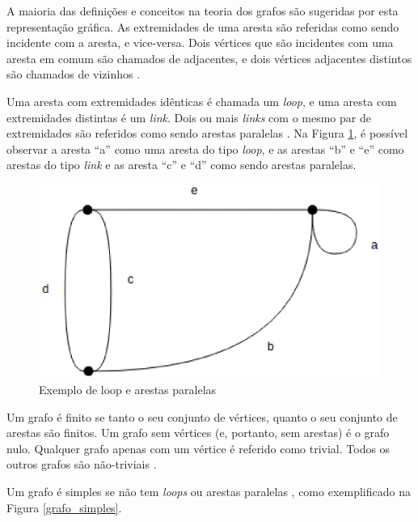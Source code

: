 A maioria das definições e conceitos na teoria dos grafos são sugeridas por esta representação gráfica. As extremidades de uma aresta são referidas como sendo incidente com a aresta, e vice-versa. Dois vértices que são incidentes com uma aresta em comum são chamados de adjacentes, e dois vértices adjacentes distintos são chamados de vizinhos \cite{Costa:2011}.

Uma aresta com extremidades idênticas é chamada um \textit{loop}, e uma aresta com extremidades distintas é um \textit{link}. Dois ou mais \textit{links} com o mesmo par de extremidades são referidos como sendo arestas paralelas \cite{Bondy:2007}. Na Figura \ref{loop_paralela}, é possível observar a aresta ``a'' como uma aresta do tipo \textit{loop}, e as arestas ``b'' e ``e'' como arestas do tipo \textit{link} e as aresta ``c'' e ``d'' como sendo arestas paralelas.

\begin{figure}[!h]
	\centering
	\includegraphics[scale=0.4]{figuras/capitulo2/loop_paralela.eps}
	\caption{Exemplo de loop e arestas paralelas}
	\label{loop_paralela}
\end{figure}

Um grafo é finito se tanto o seu conjunto de vértices, quanto o seu conjunto de arestas são finitos. Um grafo sem vértices (e, portanto, sem arestas) é o grafo nulo. Qualquer grafo apenas com um vértice é referido como trivial. Todos os outros grafos são não-triviais \cite{Costa:2011}.

Um grafo é simples se não tem \textit{loops} ou arestas paralelas \cite{Diestel:1997}, como exemplificado na Figura \ref{grafo_simples}.

